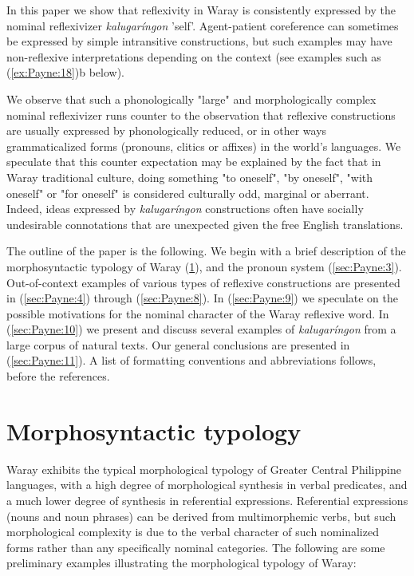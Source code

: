 \documentclass[output=paper]{langscibook}
\begin{document}
In this paper we show that reflexivity in Waray is consistently expressed by the nominal reflexivizer \textit{kalugaríngon} 'self'. Agent-patient coreference can sometimes be expressed by simple intransitive constructions, but such examples may have non-reflexive interpretations depending on the context (see examples such as (\ref{ex:Payne:18})b below). 

We observe that such a phonologically "large" and morphologically complex nominal reflexivizer runs counter to the observation that reflexive constructions are usually expressed by phonologically reduced, or in other ways grammaticalized forms (pronouns, clitics or affixes) in the world's languages. We speculate that this counter expectation may be explained by the fact that in Waray traditional culture, doing something "to oneself", "by oneself", "with oneself" or "for oneself" is considered culturally odd, marginal or aberrant. Indeed, ideas expressed by \textit{kalugaríngon} constructions often have socially undesirable connotations that are unexpected given the free English translations.

The outline of the paper is the following. We begin with a brief description of the morphosyntactic typology of Waray (\ref{sec:Payne:2}), and the pronoun system (\ref{sec:Payne:3}). Out-of-context examples of various types of reflexive constructions are presented in (\ref{sec:Payne:4}) through (\ref{sec:Payne:8}). In (\ref{sec:Payne:9}) we speculate on the possible motivations for the nominal character of the Waray reflexive word. In (\ref{sec:Payne:10}) we present and discuss several examples of \textit{kalugaríngon} from a large corpus of natural texts. Our general conclusions are presented in (\ref{sec:Payne:11}). A list of formatting conventions and abbreviations follows, before the references.



\section{Morphosyntactic typology}\label{sec:Payne:2}
Waray exhibits the typical morphological typology of Greater Central Philippine languages, with a high degree of morphological synthesis in verbal predicates, and a much lower degree of synthesis in referential expressions. Referential expressions (nouns and noun phrases) can be derived from multimorphemic verbs, but such morphological complexity is due to the verbal character of such nominalized forms rather than any specifically nominal categories. The following are some preliminary examples illustrating the morphological typology of Waray:
\end{document}

